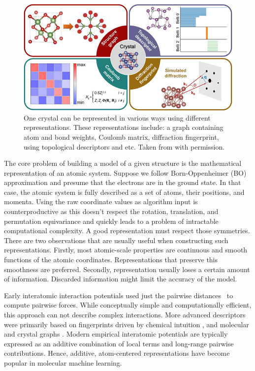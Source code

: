 \begin{figure}[htp]
    \noindent
    \centering
    \includegraphics[width=\textwidth]{figures/Crystal_representation.jpg}
    \caption{One crystal can be represented in various ways using different representations. These representations include: a graph containing atom and bond weights, Coulomb matrix,   diffraction fingerprint, using topological descriptors and etc. Taken from \cite{li2022encoding} with permission.}
    \label{fig:representations}
\end{figure}

The core problem of building a model of a given structure is the mathematical representation of an atomic system. Suppose we follow Born-Oppenheimer (BO) approximation and presume that the electrons are in the ground state. In that case, the atomic system is fully described as a set of atoms, their positions, and momenta. Using the raw coordinate values as algorithm input is counterproductive as this doesn't respect the rotation, translation, and permutation equivariance and quickly leads to a problem of intractable computational complexity. A good representation must respect those symmetries. There are two observations that are usually useful when constructing such representations. Firstly, most atomic-scale properties are continuous and smooth functions of the atomic coordinates. Representations that preserve this smoothness are preferred. Secondly, representation usually loses a certain amount of information. Discarded information might limit the accuracy of the model. 

Early interatomic interaction potentials used just the pairwise distances~\cite{jones1924determination} to compute pairwise forces. While conceptually simple and computationally efficient, this approach can not describe complex interactions. More advanced descriptors were primarily based on fingerprints driven by chemical intuition \cite{Burden2009Toward, Dong2015ChemDes, Winter2018Learning, wale2007comparison}, and molecular and crystal graphs \cite{Jiang2021CouplingCS, Singh2022MathematicalAO, Jiang2021AUD,Balasingham2022CompactGR}. Modern empirical interatomic potentials \cite{Shui2022InjectingDK, Rohskopf2017EmpiricalIP, Ito2016SystematicAT, Shui2022InjectingDK} are typically expressed as an additive combination of local terms and long-range pairwise contributions. Hence, additive, atom-centered representations have become popular in molecular machine learning. 

